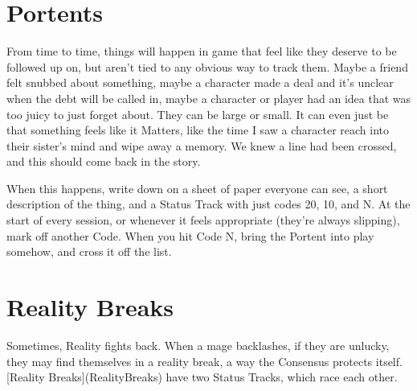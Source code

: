 \documentclass[
  oneside,
  statementpaper,
  9pt]{memoir}
\begin{document}
\hypertarget{portents}{%
\section{Portents}\label{portents}}

\begin{Narrator}

From time to time, things will happen in game that feel like they deserve to be followed up on, but aren't tied to any obvious way to track them. Maybe a friend felt snubbed about something, maybe a character made a deal and it's unclear when the debt will be called in, maybe a character or player had an idea that was too juicy to just forget about. They can be large or small. It can even just be that something feels like it Matters, like the time I saw a character reach into their sister's mind and wipe away a memory. We knew a line had been crossed, and this should come back in the story.

\end{Narrator}

\begin{MC}

When this happens, write down on a sheet of paper everyone can see, a short description of the thing, and a Status Track with just codes 20, 10, and N. At the start of every session, or whenever it feels appropriate (they're always slipping), mark off another Code. When you hit Code N, bring the Portent into play somehow, and cross it off the list.

\end{MC}

\hypertarget{reality-breaks}{%
\section{Reality Breaks}\label{reality-breaks}}

\begin{Narrator}

Sometimes, Reality fights back. When a mage backlashes, if they are unlucky, they may find themselves in a reality break, a way the Consensus protects itself. [Reality Breaks](RealityBreaks) have two Status Tracks, which race each other.

\end{Narrator}
\end{document}
